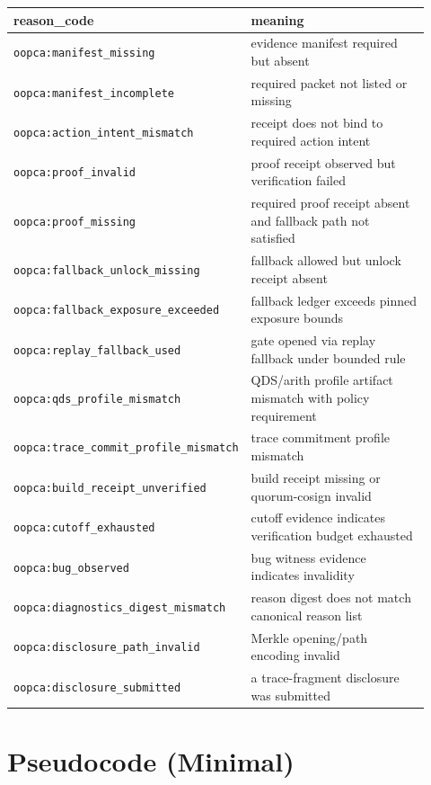 \documentclass[11pt]{article}
\begin{document}
\begin{center}
\begin{tabular}{@{}p{0.40\linewidth}p{0.52\linewidth}@{}}
\toprule
\textbf{reason\_code} & \textbf{meaning} \\ 
\midrule
\texttt{oopca:manifest\_missing} & evidence manifest required but absent \\ 
\texttt{oopca:manifest\_incomplete} & required packet not listed or missing \\ 
\texttt{oopca:action\_intent\_mismatch} & receipt does not bind to required action intent \\ 
\texttt{oopca:proof\_invalid} & proof receipt observed but verification failed \\ 
\texttt{oopca:proof\_missing} & required proof receipt absent and fallback path not satisfied \\ 
\texttt{oopca:fallback\_unlock\_missing} & fallback allowed but unlock receipt absent \\ 
\texttt{oopca:fallback\_exposure\_exceeded} & fallback ledger exceeds pinned exposure bounds \\ 
\texttt{oopca:replay\_fallback\_used} & gate opened via replay fallback under bounded rule \\ 
\texttt{oopca:qds\_profile\_mismatch} & QDS/arith profile artifact mismatch with policy requirement \\ 
\texttt{oopca:trace\_commit\_profile\_mismatch} & trace commitment profile mismatch \\ 
\texttt{oopca:build\_receipt\_unverified} & build receipt missing or quorum-cosign invalid \\ 
\texttt{oopca:cutoff\_exhausted} & cutoff evidence indicates verification budget exhausted \\ 
\texttt{oopca:bug\_observed} & bug witness evidence indicates invalidity \\ 
\texttt{oopca:diagnostics\_digest\_mismatch} & reason digest does not match canonical reason list \\ 
\texttt{oopca:disclosure\_path\_invalid} & Merkle opening/path encoding invalid \\ 
\texttt{oopca:disclosure\_submitted} & a trace-fragment disclosure was submitted \\ 
\bottomrule
\end{tabular}
\end{center}

\section{Pseudocode (Minimal)}\label{app:pseudo}
\end{document}
